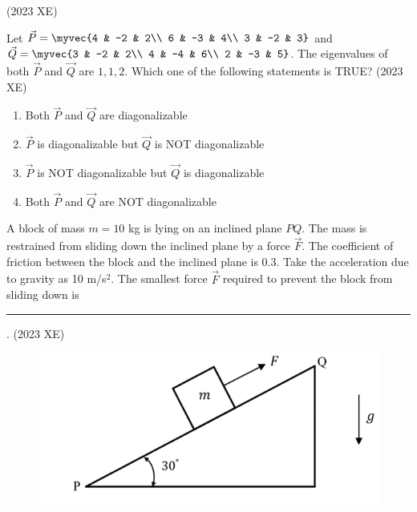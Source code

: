 \hfill(2023 XE)
\item Let  $\vec{P} = \myvec{4 & -2 & 2\\ 6 & -3 & 4\\ 3 & -2 & 3}$ and $\vec{Q} = \myvec{3 & -2 & 2\\ 4 & -4 & 6\\ 2 & -3 & 5}$.
The eigenvalues of both $\vec{P}$ and $\vec{Q}$ are $1, 1, 2$. Which one of the following
statements is TRUE?
\hfill(2023 XE)
\begin{multicols}{2}
\begin{enumerate}
\item Both $\vec{P}$ and $\vec{Q}$ are diagonalizable
\item $\vec{P}$ is diagonalizable but $\vec{Q}$ is NOT diagonalizable
\item $\vec{P}$ is NOT diagonalizable but $\vec{Q}$ is diagonalizable
\item Both $\vec{P}$ and $\vec{Q}$ are NOT diagonalizable
\end{enumerate}
\end{multicols}
\item A block of mass $m=10$ kg is lying on an inclined plane $PQ$. The mass is
restrained from sliding down the inclined plane by a force $\vec{F}$. The coefficient of
friction between the block and the inclined plane is 0.3. Take the acceleration due
to gravity as 10 m/s$^2$. The smallest force $\vec{F}$  required to prevent the block
from sliding down is \rule{1cm}{0.01pt}.
\hfill(2023 XE)
\begin{figure}[H]
\centering
\includegraphics[width=0.5\columnwidth]{GATE/2023/XE/figs/fig14.png}
\caption{}
\label{fig:figs/C/fig14.png}
\end{figure}

